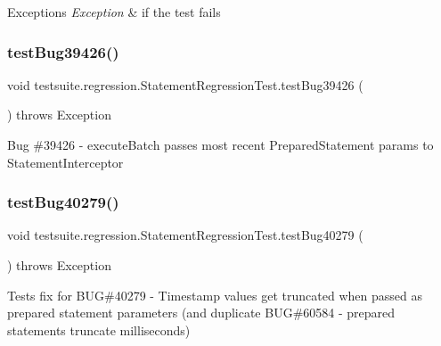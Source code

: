 \begin{DoxyExceptions}{Exceptions}
{\em Exception} & if the test fails \\
\hline
\end{DoxyExceptions}
\mbox{\label{classtestsuite_1_1regression_1_1_statement_regression_test_af7a8d3ae42412501a9698312d9308f8d}} 
\subsubsection{\texorpdfstring{test\+Bug39426()}{testBug39426()}}
{\footnotesize\ttfamily void testsuite.\+regression.\+Statement\+Regression\+Test.\+test\+Bug39426 (\begin{DoxyParamCaption}{ }\end{DoxyParamCaption}) throws Exception}

Bug \#39426 -\/ execute\+Batch passes most recent Prepared\+Statement params to Statement\+Interceptor \mbox{\label{classtestsuite_1_1regression_1_1_statement_regression_test_adcee0bfb85026b28841f5a0cd08125a2}} 
\subsubsection{\texorpdfstring{test\+Bug40279()}{testBug40279()}}
{\footnotesize\ttfamily void testsuite.\+regression.\+Statement\+Regression\+Test.\+test\+Bug40279 (\begin{DoxyParamCaption}{ }\end{DoxyParamCaption}) throws Exception}

Tests fix for B\+UG\#40279 -\/ Timestamp values get truncated when passed as prepared statement parameters (and duplicate B\+UG\#60584 -\/ prepared statements truncate milliseconds)


